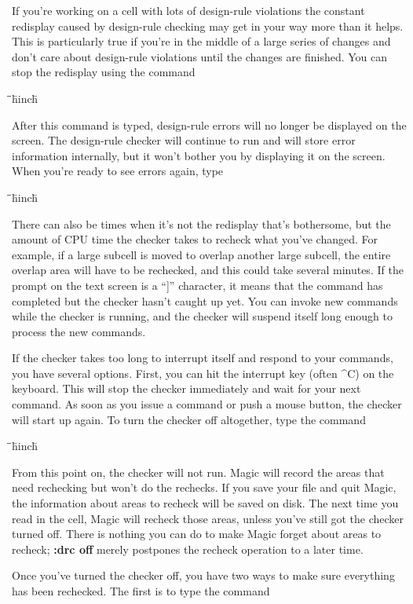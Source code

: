 \documentclass[letterpaper,twoside,12pt]{article}
\def\hinch{\hspace*{0.5in}}
\def\starti{\begin{center}\begin{tabbing}\hinch\=\hinch\=\hinch\=hinch\hinch\=\kill}
\def\endi{\end{tabbing}\end{center}}
\def\ii{\>\>\>}
\begin{document}
If you're working on a cell with lots of design-rule violations
the constant redisplay caused by design-rule checking may get
in your way more than it helps.  This is particularly true if
you're in the middle of a large series of changes and don't care
about design-rule violations until the changes are finished.
You can stop the redisplay using the command

\starti
   \ii {\bfseries :see no errors}
\endi

After this command is typed, design-rule errors will no longer
be displayed on the screen.  The design-rule checker will continue
to run and will store error information internally, but it won't
bother you by displaying it on the screen.  When you're
ready to see errors again, type

\starti
   \ii {\bfseries :see errors}
\endi

There can also be times when it's not the redisplay that's
bothersome, but the amount of CPU time the checker takes to recheck
what you've changed.
For example, if a large subcell is moved to overlap
another large subcell, the entire overlap area will have to be
rechecked, and this could take several minutes.  If the prompt
on the text screen is a ``]'' character, it means that the
command has completed but the checker hasn't caught up
yet.  You can invoke new commands while the checker is
running, and the checker will suspend itself long
enough to process the new commands.

If the checker takes too long to interrupt itself and
respond to your commands, you have several options.
First, you can hit the interrupt key (often \^{}C) on the keyboard.
This will stop the checker immediately and wait for your next
command.  As soon as you issue a command or push a mouse button,
the checker will start up again.  To turn the checker off
altogether, type the command

\starti
   \ii {\bfseries :drc off}
\endi

From this point on, the checker will not run.  Magic will
record the areas that need rechecking but won't do the
rechecks.  If you save your file and quit Magic, the information
about areas to recheck will be saved on disk.  The next time
you read in the cell, Magic will recheck those areas, unless
you've still got the checker turned off.  There is nothing
you can do to make Magic forget about areas to recheck;
{\bfseries :drc off} merely postpones the recheck operation to a
later time.

Once you've turned the checker off, you have two ways to make
sure everything has been rechecked.  The first is to type the
command
\end{document}
